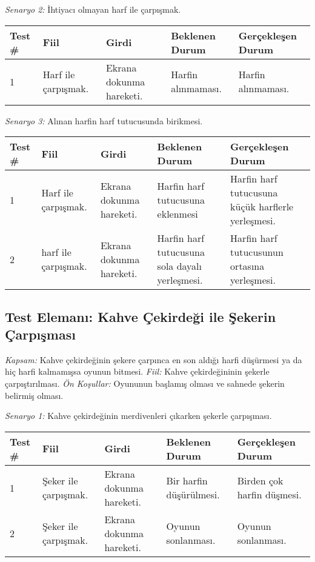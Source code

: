\documentclass[12pt,a4paper]{article}
\begin{document}
   \textit{Senaryo 2:} İhtiyacı olmayan harf ile çarpışmak.

   \begin{center}
      \begin{tabular}{ | l | p{3cm} | p{3cm} | p{3cm} | p{5cm} | }
      \hline
      Test \# & Fiil & Girdi & Beklenen Durum & Gerçekleşen Durum \\ \hline
      1 & Harf ile çarpışmak. & Ekrana dokunma hareketi. & Harfin alınmaması. & Harfin alınmaması. \\ \hline
      \end{tabular}
   \end{center}

   \textit{Senaryo 3:} Alınan harfin harf tutucusunda birikmesi.

   \begin{center}
      \begin{tabular}{ | l | p{3cm} | p{3cm} | p{3cm} | p{5cm} | }
      \hline
      Test \# & Fiil & Girdi & Beklenen Durum & Gerçekleşen Durum \\ \hline
      1 & Harf ile çarpışmak. & Ekrana dokunma hareketi. & Harfin harf tutucusuna eklenmesi & Harfin harf tutucusuna küçük harflerle yerleşmesi. \\ \hline
      2 & harf ile çarpışmak. & Ekrana dokunma hareketi. & Harfin harf tutucusuna sola dayalı yerleşmesi. & Harfin harf tutucusunun ortasına yerleşmesi. \\ \hline
      \end{tabular}
   \end{center}

   \subsection{Test Elemanı: Kahve Çekirdeği ile Şekerin Çarpışması}
   \textit{Kapsam:} Kahve çekirdeğinin şekere çarpınca en son aldığı harfi düşürmesi ya da hiç harfi kalmamışsa oyunun bitmesi. \newline
   \textit{Fiil:} Kahve çekirdeğininin şekerle çarpıştırılması. \newline
   \textit{Ön Koşullar:} Oyununun başlamış olması ve sahnede şekerin belirmiş olması. \newline

   \textit{Senaryo 1:} Kahve çekirdeğinin merdivenleri çıkarken şekerle çarpışması.

   \begin{center}
      \begin{tabular}{ | l | p{3cm} | p{3cm} | p{3cm} | p{5cm} | }
      \hline
      Test \# & Fiil & Girdi & Beklenen Durum & Gerçekleşen Durum \\ \hline
      1 & Şeker ile çarpışmak. & Ekrana dokunma hareketi. & Bir harfin düşürülmesi. & Birden çok harfin düşmesi. \\ \hline
      2 & Şeker ile çarpışmak. & Ekrana dokunma hareketi. & Oyunun sonlanması. & Oyunun sonlanması. \\ \hline
      \end{tabular}
   \end{center}
\end{document}
